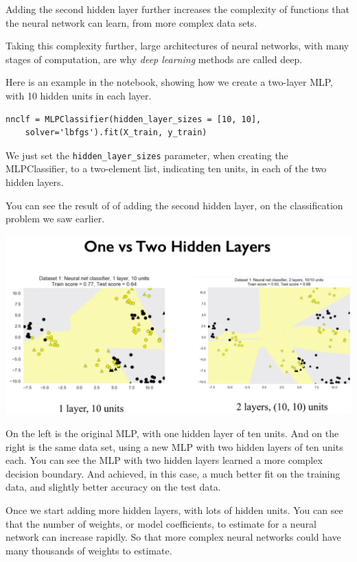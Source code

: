 \begin{multicols}{2}
Adding the second hidden layer further increases the complexity of functions that the neural network can learn, from more complex data sets. 

Taking this complexity further, large architectures of neural networks, with many stages of computation, are why \emph{deep learning} methods are called deep. 

Here is an example in the notebook, showing how we create a two-layer MLP, with 10 hidden units in each layer. 

{\scriptsize
\begin{verbatim}
nnclf = MLPClassifier(hidden_layer_sizes = [10, 10], 
    solver='lbfgs').fit(X_train, y_train)
\end{verbatim}
}

We just set the \texttt{hidden_layer_sizes} parameter, when creating the MLPClassifier, to a two-element list, indicating ten units, in each of the two hidden layers. 

You can see the result of of adding the second hidden layer, on the classification problem we saw earlier. 

\begin{center}
	\includegraphics[width=\linewidth]{img/One-vs-Two-Hidden-Layers.png} 
\end{center}

On the left is the original MLP, with one hidden layer of ten units. And on the right is the same data set, using a new MLP with two hidden layers of ten units each. You can see the MLP with two hidden layers learned a more complex decision boundary. And achieved, in this case, a much better fit on the training data, and slightly better accuracy on the test data. 

Once we start adding more hidden layers, with lots of hidden units. You can see that the number of weights, or model coefficients, to estimate for a neural network can increase rapidly. So that more complex neural networks could have many thousands of weights to estimate. 


\end{multicols}
